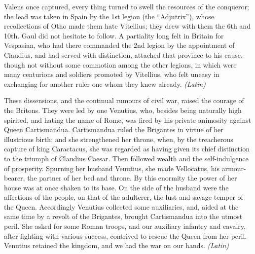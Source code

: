 Valens once captured, every thing turned to swell the resources of the conqueror; the lead was taken in Spain by the 1st legion (the ``Adjutrix''), whose recollections of Otho made them hate Vitellius; they drew with them the 6th and 10th. Gaul did not hesitate to follow. A partiality long felt in Britain for Vespasian, who had there commanded the 2nd legion by the appointment of Claudius, and had served with distinction, attached that province to his cause, though not without some commotion among the other legions, in which were many centurions and soldiers promoted by Vitellius, who felt uneasy in exchanging for another ruler one whom they knew already. \emph{(Latin)}


These dissensions, and the continual rumours of civil war, raised the courage of the Britons. They were led by one Venutius, who, besides being naturally high spirited, and hating the name of Rome, was fired by his private animosity against Queen Cartismandua. Cartismandua ruled the Brigantes in virtue of her illustrious birth; and she strengthened her throne, when, by the treacherous capture of king Caractacus, she was regarded as having given its chief distinction to the triumph of Claudius Caesar. Then followed wealth and the self-indulgence of prosperity. Spurning her husband Venutius, she made Vellocatus, his armour-bearer, the partner of her bed and throne. By this enormity the power of her house was at once shaken to its base. On the side of the husband were the affections of the people, on that of the adulterer, the lust and savage temper of the Queen. Accordingly Venutius collected some auxiliaries, and, aided at the same time by a revolt of the Brigantes, brought Cartismandua into the utmost peril. She asked for some Roman troops, and our auxiliary infantry and cavalry, after fighting with various success, contrived to rescue the Queen from her peril. Venutius retained the kingdom, and we had the war on our hands. \emph{(Latin)}


